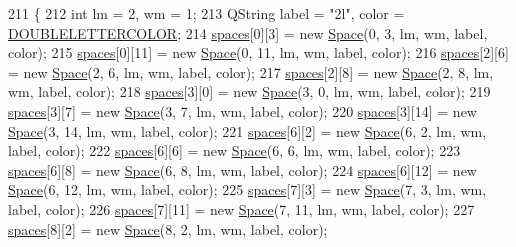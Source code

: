 \begin{DoxyCode}
211 \{
212     \textcolor{keywordtype}{int} lm = 2, wm = 1;
213     QString label = \textcolor{stringliteral}{"2l"}, color = \hyperlink{board_8h_ae1643176725e430fda174728d157a635}{DOUBLELETTERCOLOR};
214     \hyperlink{class_board_a73b12248ddb6ee3adc24f4458d8661c2}{spaces}[0][3] = \textcolor{keyword}{new} \hyperlink{class_space}{Space}(0, 3, lm, wm, label, color);
215     \hyperlink{class_board_a73b12248ddb6ee3adc24f4458d8661c2}{spaces}[0][11] = \textcolor{keyword}{new} \hyperlink{class_space}{Space}(0, 11, lm, wm, label, color);
216     \hyperlink{class_board_a73b12248ddb6ee3adc24f4458d8661c2}{spaces}[2][6] = \textcolor{keyword}{new} \hyperlink{class_space}{Space}(2, 6, lm, wm, label, color);
217     \hyperlink{class_board_a73b12248ddb6ee3adc24f4458d8661c2}{spaces}[2][8] = \textcolor{keyword}{new} \hyperlink{class_space}{Space}(2, 8, lm, wm, label, color);
218     \hyperlink{class_board_a73b12248ddb6ee3adc24f4458d8661c2}{spaces}[3][0] = \textcolor{keyword}{new} \hyperlink{class_space}{Space}(3, 0, lm, wm, label, color);
219     \hyperlink{class_board_a73b12248ddb6ee3adc24f4458d8661c2}{spaces}[3][7] = \textcolor{keyword}{new} \hyperlink{class_space}{Space}(3, 7, lm, wm, label, color);
220     \hyperlink{class_board_a73b12248ddb6ee3adc24f4458d8661c2}{spaces}[3][14] = \textcolor{keyword}{new} \hyperlink{class_space}{Space}(3, 14, lm, wm, label, color);
221     \hyperlink{class_board_a73b12248ddb6ee3adc24f4458d8661c2}{spaces}[6][2] = \textcolor{keyword}{new} \hyperlink{class_space}{Space}(6, 2, lm, wm, label, color);
222     \hyperlink{class_board_a73b12248ddb6ee3adc24f4458d8661c2}{spaces}[6][6] = \textcolor{keyword}{new} \hyperlink{class_space}{Space}(6, 6, lm, wm, label, color);
223     \hyperlink{class_board_a73b12248ddb6ee3adc24f4458d8661c2}{spaces}[6][8] = \textcolor{keyword}{new} \hyperlink{class_space}{Space}(6, 8, lm, wm, label, color);
224     \hyperlink{class_board_a73b12248ddb6ee3adc24f4458d8661c2}{spaces}[6][12] = \textcolor{keyword}{new} \hyperlink{class_space}{Space}(6, 12, lm, wm, label, color);
225     \hyperlink{class_board_a73b12248ddb6ee3adc24f4458d8661c2}{spaces}[7][3] = \textcolor{keyword}{new} \hyperlink{class_space}{Space}(7, 3, lm, wm, label, color);
226     \hyperlink{class_board_a73b12248ddb6ee3adc24f4458d8661c2}{spaces}[7][11] = \textcolor{keyword}{new} \hyperlink{class_space}{Space}(7, 11, lm, wm, label, color);
227     \hyperlink{class_board_a73b12248ddb6ee3adc24f4458d8661c2}{spaces}[8][2] = \textcolor{keyword}{new} \hyperlink{class_space}{Space}(8, 2, lm, wm, label, color);

\end{DoxyCode}
